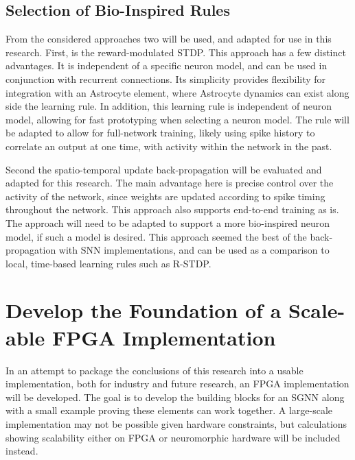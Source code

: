     \subsection{Selection of Bio-Inspired Rules}
    From the considered approaches two will be used, and adapted for use in this
    research. First, is the reward-modulated STDP. This approach has a few
    distinct advantages. It is independent of a specific neuron model, and can
    be used in conjunction with recurrent connections. Its simplicity provides
    flexibility for integration with an Astrocyte element, where Astrocyte
    dynamics can exist along side the learning rule. In addition, this learning
    rule is independent of neuron model, allowing for fast prototyping when
    selecting a neuron model. The rule will be adapted to allow for full-network
    training, likely using spike history to correlate an output at one time,
    with activity within the network in the past.
    
    Second the spatio-temporal update back-propagation will be evaluated and
    adapted for this research. The main advantage here is precise control over
    the activity of the network, since weights are updated according to spike
    timing throughout the network. This approach also supports end-to-end
    training as is. The approach will need to be adapted to support a more
    bio-inspired neuron model, if such a model is desired. This approach seemed
    the best of the back-propagation with SNN implementations, and can be used
    as a comparison to local, time-based learning rules such as R-STDP.
    
    \section{Develop the Foundation of a Scale-able FPGA Implementation}
    In an attempt to package the conclusions of this research into a usable
    implementation, both for industry and future research, an FPGA
    implementation will be developed. The goal is to develop the building blocks
    for an SGNN along with a small example proving these elements can work
    together. A large-scale implementation may not be possible given hardware
    constraints, but calculations showing scalability either on FPGA or
    neuromorphic hardware will be included instead.
    
